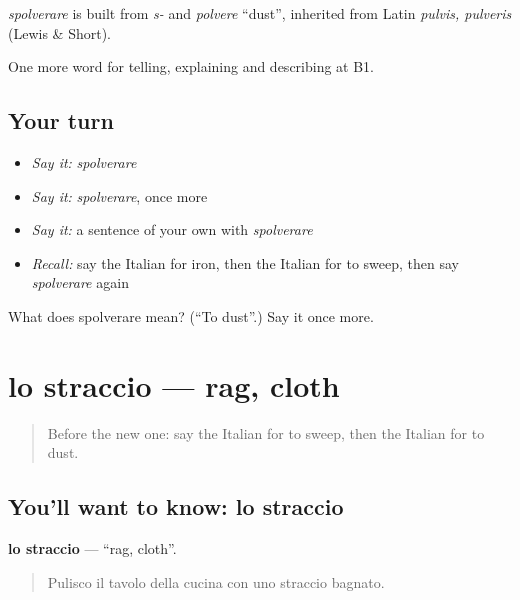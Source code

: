 \begin{cousinweb}
\emph{spolverare} is built from \emph{s-} and \emph{polvere} \textquotedblleft{}dust\textquotedblright{}, inherited from Latin \emph{pulvis, pulveris} (Lewis \& Short).
\end{cousinweb}

\begin{grammarlens}[title={What you've built}]
One more word for telling, explaining and describing at B1.
\end{grammarlens}

\subsection*{Your turn}
\begin{itemize}
\raggedright
  \item \emph{Say it:} \emph{spolverare}
  \item \emph{Say it:} \emph{spolverare}, once more
  \item \emph{Say it:} a sentence of your own with \emph{spolverare}
  \item \emph{Recall:} say the Italian for iron, then the Italian for to sweep, then say \emph{spolverare} again
\end{itemize}

\begin{tcolorbox}[breakable,colback=teal!4,colframe=teal!35!black,title={Before you move on}]
What does spolverare mean? (\textquotedblleft{}To dust\textquotedblright{}.) Say it once more.
\end{tcolorbox}
\section[lo straccio]{lo straccio — rag, cloth}

\label{lesson:IT-C532-straccio}



\begin{quote}
Before the new one: say the Italian for to sweep, then the Italian for to dust.
\end{quote}

\subsection*{You'll want to know: lo straccio}
\textbf{lo straccio} — \textquotedblleft{}rag, cloth\textquotedblright{}.

\begin{quote}
Pulisco il tavolo della cucina con uno straccio bagnato.
\end{quote}

